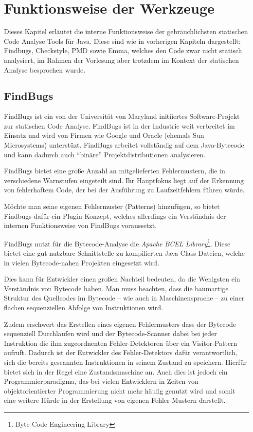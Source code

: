 \section{Funktionsweise der Werkzeuge}

Dieses Kapitel erläutet die interne Funktionsweise der gebräuchlichsten statischen Code Analyse Tools für Java. Diese sind wie in vorherigen Kapiteln dargestellt: Findbugs, Checkstyle, PMD sowie Emma, welches den Code zwar nicht statisch analysiert, im Rahmen der Vorlesung aber trotzdem im Kontext der statischen Analyse besprochen wurde.


\subsection{FindBugs}

FindBugs ist ein von der Universität von Maryland initiiertes Software-Projekt zur statischen Code Analyse. FindBugs ist in der Industrie weit verbreitet im Einsatz und wird von Firmen wie Google und Oracle (ehemals Sun Microsystems) unterstüzt.
FindBugs arbeitet vollständig auf dem Java-Bytecode und kann dadurch auch ``binäre'' Projektdistributionen analysieren. 

FindBugs bietet eine große Anzahl an mitgelieferten Fehlermustern, die in verschiedene Warnstufen eingeteilt sind. Ihr Hauptfokus liegt auf der Erkennung von fehlerhaftem Code, der bei der Ausführung zu Laufzeitfehlern führen würde.

Möchte man seine eigenen Fehlermuster (Patterns) hinzufügen, so bietet Findbugs dafür ein Plugin-Konzept, welches allerdings ein Verständnis der internen Funktionsweise von FindBugs voraussetzt.
 
FindBugs nutzt für die Bytecode-Analyse die \textit{Apache BCEL Library}\footnote{Byte Code Engineering Library}. Diese bietet eine gut nutzbare Schnittstelle zu kompilierten Java-Class-Dateien, welche in vielen Bytecode-nahen Projekten eingesetzt wird. %

Dies kann für Entwickler einen großen Nachteil bedeuten, da die Wenigsten ein Verständnis von Bytecode haben. Man muss beachten, dass die baumartige Struktur des Quellcodes im Bytecode -- wie auch in Maschinensprache -- zu einer flachen sequenziellen Abfolge von Instruktionen wird. 

Zudem erschwert das Erstellen eines eigenen Fehlermusters dass der Bytecode sequenziell Durchlaufen wird und der Bytecode-Scanner dabei bei jeder Instruktion die ihm zugeordnenten Fehler-Detektoren über ein Visitor-Pattern aufruft. 
Dadurch ist der Entwickler des Fehler-Detektors dafür verantwortlich, sich die bereits gescannten Instruktionen in seinem Zustand zu speichern. Hierfür bietet sich in der Regel eine Zustandsmaschine an. Auch dies ist jedoch ein Programmierparadigma, das bei vielen Entwicklern in Zeiten von objektorientierter Programmierung nicht mehr häufig genutzt wird und somit eine weitere Hürde in der Erstellung von eigenen Fehler-Mustern darstellt.


